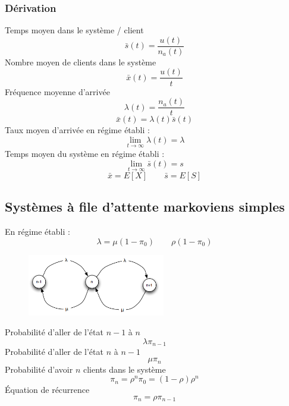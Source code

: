 \documentclass[resume]{subfiles}
\begin{document}
\subsubsection{Dérivation}
Temps moyen dans le système / client
$$\bar{s}(t)=\frac{u(t)}{n_a(t)}$$
Nombre moyen de clients dans le système
$$\bar{x}(t)=\frac{u(t)}{t}$$
Fréquence moyenne d'arrivée
$$\lambda(t)=\frac{n_a(t)}{t}$$
$$\bar{x}(t)=\lambda(t)\bar{s}(t)$$
Taux moyen d'arrivée en régime établi :
$$\lim_{t\to\infty}\lambda(t)=\lambda$$
Temps moyen du système en régime établi :
$$\lim_{t\to\infty}\bar{s}(t)=s$$
$$\bar{x}=E[X]\qquad \bar{s}=E[S]$$
\subsection{Systèmes à file d'attente markoviens simples}
En régime établi :
$$\lambda=\mu(1-\pi_0)\qquad \rho(1-\pi_0)$$
\begin{figure}[H]
\centering
\includegraphics[width=6.00cm]{img_19.png}
\end{figure}
Probabilité d'aller de l'état $n-1$ à $n$
$$\lambda\pi_{n-1}$$
Probabilité d'aller de l'état $n$ à $n-1$
$$\mu\pi_n$$
Probabilité d'avoir $n$ clients dans le système
$$\pi_n=\rho^{n}\pi_0=(1-\rho)\rho^n$$
Équation de récurrence
$$\pi_n=\rho\pi_{n-1}$$
\end{document}

